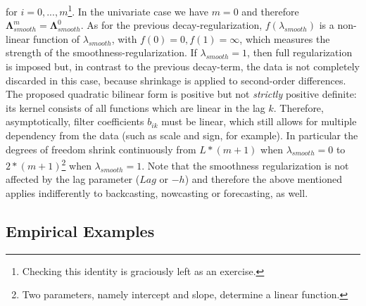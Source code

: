 \documentclass[a4paper]{book}
\begin{document}
for $i=0,...,m$\footnote{Checking this identity is graciously left as an exercise.}. In the univariate case we have $m=0$ and therefore $\boldsymbol{\Lambda}_{smooth}^m=\boldsymbol{\Lambda}_{smooth}^0$. As for the previous decay-regularization, $f(\lambda_{smooth})$ is a non-linear function of $\lambda_{smooth}$, with $f(0)=0, f(1)=\infty$, which measures the strength of the smoothness-regularization. If $\lambda_{smooth}=1$, then full regularization is imposed but, in contrast to the previous decay-term, the data is not completely discarded in this case, because shrinkage is applied to {second-order differences}. The proposed quadratic bilinear form is positive but not \emph{strictly} positive definite: its kernel consists of all functions which are linear in the lag $k$. Therefore, asymptotically, filter coefficients $b_{ik}$ must be linear, which still allows for multiple dependency from the data (such as scale and sign, for example). In particular the degrees of freedom shrink continuously from $L*(m+1)$ when $\lambda_{smooth}=0$ to $2*(m+1)$\footnote{Two parameters, namely intercept and slope, determine a linear function.} when $\lambda_{smooth}=1$. Note that the smoothness regularization is not affected by the lag parameter ($Lag$ or $-h$) and therefore the above mentioned applies indifferently to backcasting, nowcasting or forecasting, as well.



\subsection{Empirical Examples}
\end{document}
